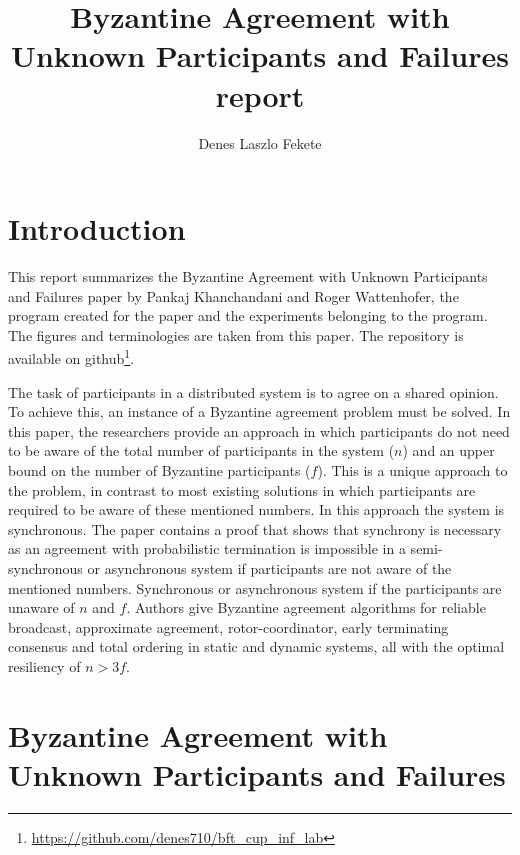 \documentclass{article}
\begin{document}
\title{Byzantine Agreement with Unknown Participants and Failures report}
\author{Denes Laszlo Fekete}
\maketitle   

\section{Introduction}
This report summarizes the Byzantine Agreement with Unknown Participants and Failures paper by Pankaj Khanchandani and Roger Wattenhofer, the program created for the paper  and the experiments belonging to the program. The figures and terminologies are taken from this paper\cite{khanchandani2021byzantine}. The repository is available on github\footnote{\url{https://github.com/denes710/bft_cup_inf_lab}}.

The task of participants in a distributed system is to agree on a shared opinion. To achieve this, an instance of a Byzantine agreement problem must be solved. In this paper, the researchers provide an approach in which participants do not need to be aware of the total number of participants in the system (\(n\)) and an upper bound on the number of Byzantine participants (\(f\)). This is a unique approach to the problem, in contrast to most existing solutions in which participants are required to be aware of these mentioned numbers. In this approach the system is synchronous. The paper contains a proof that shows that synchrony is necessary as an agreement with probabilistic termination is impossible in a semi-synchronous or asynchronous system if participants are not aware of the mentioned numbers. Synchronous or asynchronous system if the participants are unaware of \(n\) and \(f\). Authors give Byzantine agreement algorithms for reliable broadcast, approximate agreement, rotor-coordinator, early terminating consensus and total ordering in static and dynamic systems, all with the optimal resiliency of \(n > 3f\).

\section{Byzantine Agreement with Unknown Participants and Failures}
\end{document}
